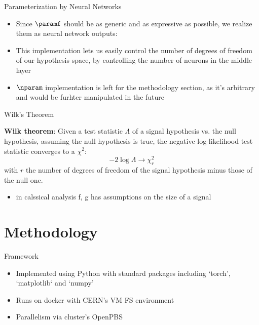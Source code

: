 \documentclass[notheorems]{beamer}
\begin{document}
\begin{frame}{Parameterization by Neural Networks}
    \begin{itemize}
        \item Since $\paramf$ should be as generic and as expressive as possible, we realize them as neural network outputs:
    \end{itemize}
    \begin{itemize}
        \item This implementation lets us easily control the number of degrees of freedom of our hypothesis space, by controlling the number of neurons in the middle layer
        \item $\nparam$ implementation is left for the methodology section, as it's arbitrary and would be furhter manipulated in the future
    \end{itemize}
\end{frame}

\begin{frame}{Wilk's Theorem}
    \begin{theorem}
        \textbf{Wilk theorem}: Given a test statistic $\Lambda$ of a signal hypothesis vs. the null hypothesis, assuming the null hypothesis is true, the negative log-likelihood test statistic converges to a $\chi^2$:
        \begin{equation*}
            -2 \log \Lambda \to \chi^2_r
        \end{equation*}
        with $r$ the number of degrees of freedom of the signal hypothesis minus those of the null one.
    \end{theorem}
    \begin{itemize}
        \item in calssical analysis f, g has assumptions on the size of a signal
    \end{itemize}
\end{frame}

\section{Methodology}

\begin{frame}{Framework}
    \begin{itemize}
        \item Implemented using Python with standard packages including `torch', `matplotlib` and `numpy'
        \item Runs on docker with CERN's VM FS environment
        \item Parallelism via cluster's OpenPBS
    \end{itemize}
\end{frame}
\end{document}
